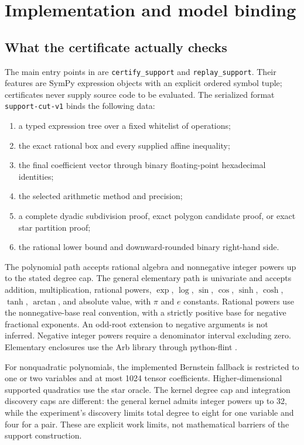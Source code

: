 \section{Implementation and model binding}\label{sec:integration}

\subsection{What the certificate actually checks}

The main entry points in
 are
\texttt{certify\_support} and \texttt{replay\_support}. Their features
are SymPy expression objects with an explicit ordered symbol tuple;
certificates never supply source code to be evaluated. The serialized
format \texttt{support-cut-v1} binds the following data:
\begin{enumerate}
\item a typed expression tree over a fixed whitelist of operations;
\item the exact rational box and every supplied affine inequality;
\item the final coefficient vector through binary floating-point
      hexadecimal identities;
\item the selected arithmetic method and precision;
\item a complete dyadic subdivision proof, exact polygon candidate
      proof, or exact star partition proof;
\item the rational lower bound and downward-rounded binary right-hand
      side.
\end{enumerate}
The polynomial path accepts rational algebra and nonnegative integer
powers up to the stated degree cap. The general elementary path is
univariate and accepts addition, multiplication, rational powers,
$\exp$, $\log$, $\sin$, $\cos$, $\sinh$, $\cosh$, $\tanh$,
$\arctan$, and absolute value, with $\pi$ and $e$ constants.
Rational powers use the nonnegative-base real convention, with a
strictly positive base for negative fractional exponents. An odd-root
extension to negative arguments is not inferred. Negative integer powers
require a denominator interval excluding zero. Elementary enclosures
use the Arb library through python-flint \cite{Johansson2017arb}.

For nonquadratic polynomials, the implemented Bernstein fallback is
restricted to one or two variables and at most 1024 tensor coefficients.
Higher-dimensional supported quadratics use the star oracle. The kernel
degree cap and integration discovery caps are different: the general
kernel admits integer powers up to 32, while the experiment's discovery
limits total degree to eight for one variable and four for a pair.
These are explicit work limits, not mathematical barriers of the
support construction.

